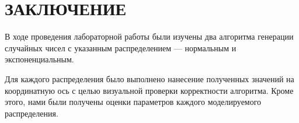 \section*{ЗАКЛЮЧЕНИЕ}

В ходе проведения лабораторной работы были изучены два алгоритма
генерации случайных чисел с указанным распределением --- нормальным и экспоненциальным.

Для каждого распределения было выполнено нанесение полученных значений на координатную ось 
с целью визуальной проверки корректности алгоритма. 
Кроме этого, нами были получены оценки параметров каждого моделируемого распределения.

\newpage
